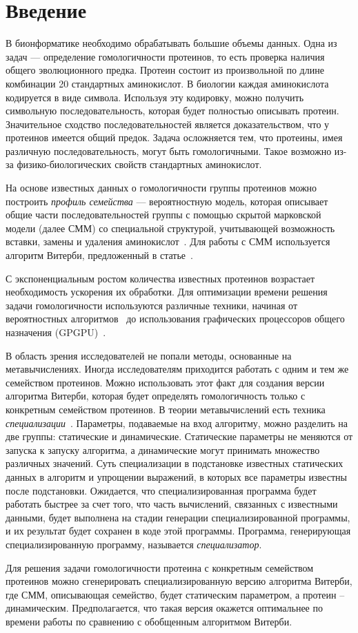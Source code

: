 \section*{Введение}

В бионформатике необходимо обрабатывать большие объемы данных.
Одна из задач --- определение гомологичности протеинов, то есть проверка наличия общего эволюционного предка.
Протеин состоит из произвольной по длине комбинации 20 стандартных аминокислот.
В биологии каждая аминокислота кодируется в виде символа.
Используя эту кодировку, можно получить символьную последовательность,
которая будет полностью описывать протеин.
Значительное сходство последовательностей является доказательством, что у
протеинов имеется общий предок.
Задача осложняется тем, что протеины, имея различную последовательность, могут
быть гомологичными.
Такое возможно из-за физико-биологических свойств стандартных аминокислот.

На основе известных данных о гомологичности группы протеинов можно построить
\emph{профиль семейства} --- вероятностную модель, которая описывает общие
части последовательностей группы с помощью  скрытой марковской модели (далее СММ) со специальной структурой, учитывающей возможность вставки, замены и
удаления аминокислот~\cite{HMM_Eddy}.
Для работы с СММ используется алгоритм Витерби, предложенный в статье~\cite{Viterbi}.

С экспоненциальным ростом количества известных протеинов возрастает
необходимость ускорения их обработки.
Для оптимизации времени решения задачи гомологичности используются различные 
техники, начиная от вероятностных алгоритмов~\cite{MSV_Eddy} до использования
графических процессоров общего назначения (GPGPU)~\cite{cudampf}.

В область зрения исследователей не попали методы, основанные на
метавычислениях.
Иногда исследователям приходится работать с одним и тем же семейством
протеинов.
Можно использовать этот факт для создания версии алгоритма Витерби, 
которая будет определять гомологичность только с конкретным семейством протеинов.
В теории метавычислений есть техника \emph{специализации}~\cite{Jones_spec}.
Параметры, подаваемые на вход алгоритму, можно разделить на две группы:
статические и динамические.
Статические параметры не меняются от запуска к запуску алгоритма, а 
динамические могут принимать множество различных значений.
Суть специализации в подстановке известных статических данных в алгоритм и
упрощении выражений, в которых все параметры известны после подстановки.
Ожидается, что специализированная программа будет работать быстрее за счет
того, что часть вычислений, связанных с известными данными, будет выполнена на
стадии генерации специализированной программы, и их результат будет сохранен в
коде этой программы.
Программа, генерирующая специализированную программу, называется \emph{специализатор}.

Для решения задачи гомологичности протеина с конкретным семейством протеинов 
можно сгенерировать специализированную версию алгоритма Витерби,
где СММ, описывающая семейство, будет статическим параметром, 
а протеин -- динамическим.
Предполагается, что такая версия окажется оптимальнее по времени работы 
по сравнению с обобщенным алгоритмом Витерби.
